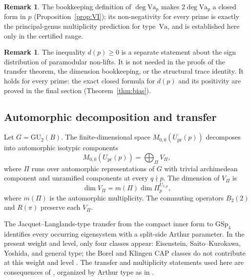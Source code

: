 \documentclass[11pt]{amsart}
\theoremstyle{plain}
\theoremstyle{definition}
\newtheorem{remark}[theorem]{Remark}
\newcommand{\GU}{\mathrm{GU}}
\newcommand{\GSp}{\mathrm{GSp}}
\newcommand{\Upr}{U_{\mathrm{pr}}}
\newcommand{\Va}{\mathrm{Va}}
\providecommand{\Upr}{U_{\mathrm{pr}}}
\providecommand{\Va}{\mathrm{Va}}
\begin{document}
	\begin{remark}
		The bookkeeping definition of $\deg\Va_p$ makes $2\deg\Va_p$ a closed
		form in $p$ (Proposition~\ref{prop:VI}); its non-negativity for
		every prime is exactly the principal-genus multiplicity prediction for
		type~$\Va$, and is established here only in the certified range.
	\end{remark}
	
	\begin{remark}\label{rem:dp-status}
		The inequality $d(p)\ge0$ is a separate statement about the sign distribution
		of paramodular non-lifts. It is not needed in the proofs of the transfer
		theorem, the dimension bookkeeping, or the structural trace identity. It
		holds for every prime: the exact closed formula for $d(p)$ and its
		positivity are proved in the final section (Theorem~\ref{thm:bias}).
	\end{remark}
	
	\subsection{Automorphic decomposition and transfer}
	\label{ss:automorphic-transfer}
	
	Let $G=\GU_2(B)$. The finite-dimensional space
	$M_{0,0}(\Upr(p))$ decomposes into automorphic isotypic components
	\[
	M_{0,0}(\Upr(p))=\bigoplus_{\Pi}V_\Pi,
	\]
	where $\Pi$ runs over automorphic representations of $G$ with trivial
	archimedean component and unramified components at every $q\nmid p$.
	The dimension of $V_\Pi$ is
	\[
	\dim V_\Pi=m(\Pi)\dim\Pi_p^{U_{1,p}},
	\]
	where $m(\Pi)$ is the automorphic multiplicity. The commuting operators
	$B_2(2)$ and $R(\pi)$ preserve each $V_\Pi$.
	
	The Jacquet--Langlands-type transfer from the compact inner form to
	$\GSp_4$ identifies every occurring eigensystem with a split-side Arthur
	parameter. In the present weight and level, only four classes appear:
	Eisenstein, Saito--Kurokawa, Yoshida, and general type; the Borel and
	Klingen CAP classes do not contribute at this weight and level
	\cite[proof of Thm.~9.6]{DPRT}. The transfer and
	multiplicity statements used here are consequences of
	\cite{RoesnerWeissauer2021,vanHoften,DPRT}, organized by Arthur type as in
	\cite{Schmidt2018}.
	
\end{document}
